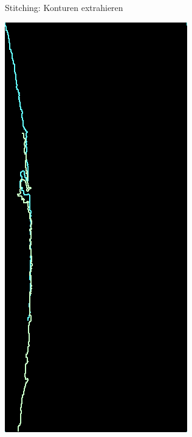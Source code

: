 \documentclass[../slides.tex]{subfiles}
\begin{document}
\begin{frame}{Stitching: Konturen extrahieren}
\begin{minipage}[H]{.15\textwidth}
    \end{minipage}
    \begin{minipage}[H]{.2\textwidth}
        \centering
        \includegraphics[width=\textwidth]{img_niklas/382_match.png}

\end{minipage}
\end{frame}
\end{document}
